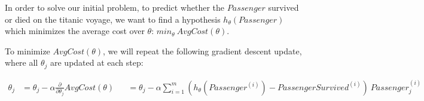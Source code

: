 \documentclass{article}
\begin{document}
In order to solve our initial problem, to predict whether the $Passenger$ survived or died on the titanic voyage, we want to find a hypothesis $h_{\theta}(Passenger)$ which minimizes the average cost over $\theta$: $ min_{\theta} ~ AvgCost(\theta)$.

To minimize $AvgCost(\theta)$, we will repeat the following gradient descent update, where all $\theta_j$ are updated at each step:

\begin{equation}
\begin{split}
\theta_j
 & = \theta_j - \alpha \frac{\partial}{\partial\theta_j} AvgCost(\theta)
 &
 & = \theta_j - \alpha \sum_{i=1}^m (h_{\theta}(Passenger^{(i)}) - PassengerSurvived^{(i)}) ~ Passenger_j^{(i)}
\end{split}
\end{equation}
\end{document}
